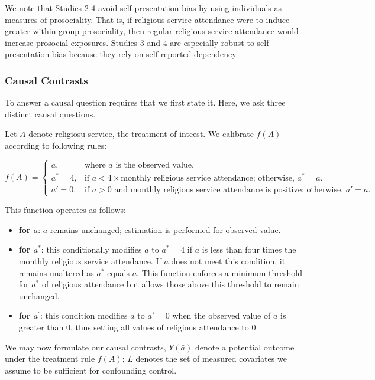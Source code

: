 \documentclass[
  singlecolumn]{article}
\begin{document}
We note that Studies 2-4 avoid self-presentation bias by using
individuals as measures of prosociality. That is, if religious service
attendance were to induce greater within-group prosociality, then
regular religious service attendance would increase prosocial exposures.
Studies 3 and 4 are especially robust to self-presentation bias because
they rely on self-reported dependency.

\subsubsection{Causal Contrasts}\label{causal-contrasts}

To answer a causal question requires that we first state it. Here, we
ask three distinct causal questions.

Let \(A\) denote religiosu service, the treatment of inteest. We
calibrate \(f(A)\) according to following rules:

\[
f(A) = 
\begin{cases} 
a, & \text{where } a \text{ is the observed value.}\\
a^* = 4, & \text{if } a < 4 \times \text{monthly religious service attendance; otherwise, } a^* = a.\\
a' = 0, & \text{if } a > 0 \text{ and monthly religious service attendance is positive; otherwise, } a' = a. 
\end{cases}
\]

This function operates as follows:

\begin{itemize}
\item
  \textbf{for \(a\)}: \(a\) remains unchanged; estimation is performed
  for observed value.
\item
  \textbf{for \(a^*\)}: this conditionally modifies \(a\) to \(a^* = 4\)
  if \(a\) is less than four times the monthly religious service
  attendance. If \(a\) does not meet this condition, it remains
  unaltered as \(a^*\) equals \(a\). This function enforces a minimum
  threshold for \(a^*\) of religious attendance but allows those above
  this threshold to remain unchanged.
\item
  \textbf{for \(a^\prime\)}: this condition modifies \(a\) to \(a' = 0\)
  when the observed value of \(a\) is greater than 0, thus setting all
  values of religious attendance to 0.
\end{itemize}

We may now formulate our causal contrasts, \(Y(\bar{a})\) denote a
potential outcome under the treatment rule \(f(A)\); \(L\) denotes the
set of measured covariates we assume to be sufficient for confounding
control.
\end{document}
